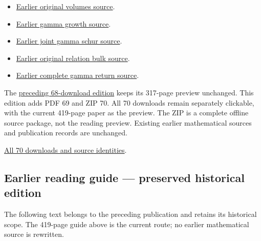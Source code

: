 \documentclass[
]{article}
\begin{document}
\begin{itemize}
{  original kernel matrices source}.
\item
  \href{https://github.com/KokunoYumeto/zeta-function-research-reader/tree/1c8ec52c85c173adc9f8403a8a26914955e2f5a9/workbenches/splitzero-tandem/continuations/20260914-original-volumes}{Earlier
  original volumes source}.
\item
  \href{https://github.com/KokunoYumeto/zeta-function-research-reader/tree/41f020e0475429943252e69a1b4edd849393c780/workbenches/splitzero-tandem/continuations/20260914-gamma-growth}{Earlier
  gamma growth source}.
\item
  \href{https://github.com/KokunoYumeto/zeta-function-research-reader/tree/2be3b23974bf040f4ea06240b8a4b85372f7c71d/workbenches/splitzero-tandem/continuations/20260914-joint-gamma-schur}{Earlier
  joint gamma schur source}.
\item
  \href{https://github.com/KokunoYumeto/zeta-function-research-reader/tree/01fc8820e3a3ea69afa22b8ab1b0b5ca61869456/workbenches/splitzero-tandem/continuations/20260914-original-relation-bulk}{Earlier
  original relation bulk source}.
\item
  \href{https://github.com/KokunoYumeto/zeta-function-research-reader/tree/01fc8820e3a3ea69afa22b8ab1b0b5ca61869456/workbenches/splitzero-tandem/continuations/20260914-complete-gamma-return}{Earlier
  complete gamma return source}.
\end{itemize}

The \href{https://doi.org/10.5281/zenodo.22760901}{preceding 68-download
edition} keeps its 317-page preview unchanged. This edition adds PDF 69
and ZIP 70. All 70 downloads remain separately clickable, with the
current 419-page paper as the preview. The ZIP is a complete offline
source package, not the reading preview. Existing earlier mathematical
sources and publication records are unchanged.

\href{calculation_edition_20260915_native_boundary/README.md}{All 70
downloads and source identities}.

\subsection{Earlier reading guide --- preserved historical
edition}\label{earlier-reading-guide-preserved-historical-edition-2}

The following text belongs to the preceding publication and retains its
historical scope. The 419-page guide above is the current route; no
earlier mathematical source is rewritten.
\end{document}
